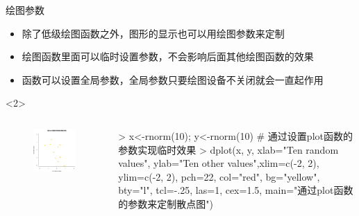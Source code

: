 \documentclass{beamerthemeMono}
\begin{document}
\begin{frame}[t,fragile]{\subsecname}{绘图参数}
\begin{itemize}
\item<1-> 除了低级绘图函数之外，图形的显示也可以用绘图参数来定制
\item<2-> 绘图函数里面可以临时设置参数，不会影响后面其他绘图函数的效果
\item<3-> 函数可以设置全局参数，全局参数只要绘图设备不关闭就会一直起作用
\end{itemize}

\begin{overlayarea}{\textwidth}{\textheight}
\begin{onlyenv}<2>
\begin{columns}
        \begin{column}{.4\textwidth}
          \begin{figure}
            \centering
            \includegraphics[width=\columnwidth]{plot.png}
          \end{figure}
        \end{column}

        \begin{column}{.6\textwidth}
 \centering
\begin{rcode}
> x<-rnorm(10); y<-rnorm(10)
# 通过设置plot函数的参数实现临时效果
> dplot(x, y, xlab="Ten random values", ylab="Ten other values",xlim=c(-2, 2), ylim=c(-2, 2), pch=22, col="red", bg="yellow", bty="l", tcl=-.25, las=1, cex=1.5, main="通过plot函数的参数来定制散点图")
\end{rcode}
        \end{column}
      \end{columns}
\end{onlyenv}


\end{overlayarea}
\end{frame}
\end{document}
